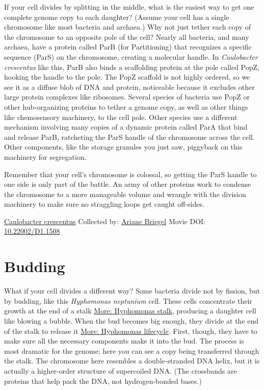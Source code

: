 \documentclass[]{tufte-book}
\begin{document}
If your cell divides by splitting in the middle, what is the easiest way to get one complete genome copy to each daughter? (Assume your cell has a single chromosome like most bacteria and archaea.) Why not just tether each copy of the chromosome to an opposite pole of the cell? Nearly all bacteria, and many archaea, have a protein called ParB (for Partitioning) that recognizes a specific sequence (ParS) on the chromosome, creating a molecular handle. In \emph{Caulobacter crescentus} like this, ParB also binds a scaffolding protein at the pole called PopZ, hooking the handle to the pole. The PopZ scaffold is not highly ordered, so we see it as a diffuse blob of DNA and protein, noticeable because it excludes other large protein complexes like ribosomes. Several species of bacteria use PopZ or other hub-organizing proteins to tether a genome copy, as well as other things like chemosensory machinery, to the cell pole. Other species use a different mechanism involving many copies of a dynamic protein called ParA that bind and release ParB, ratcheting the ParS handle of the chromosome across the cell. Other components, like the storage granules you just saw, piggyback on this machinery for segregation.

Remember that your cell's chromosome is colossal, so getting the ParS handle to one side is only part of the battle. An army of other proteins work to condense the chromosome to a more manageable volume and wrangle with the division machinery to make sure no straggling loops get caught off-sides.



\hypertarget{htmlwidget-8f7ce5a3e32dfbf862eb}{}

\label{fig:5-2}\protect\hyperlink{tree}{Caulobacter crescentus} Collected by: \protect\hyperlink{ariane_briegel}{Ariane Briegel} Movie DOI: \href{https://doi.org/10.22002/D1.1508}{10.22002/D1.1508}

\hypertarget{budding}{%
\section{Budding}\label{budding}}

What if your cell divides a different way? Some bacteria divide not by fission, but by budding, like this \emph{Hyphomonas neptunium} cell. These cells concentrate their growth at the end of a stalk \protect\hyperlink{Hyphomonas_stalk}{More: Hyphomonas stalk}, producing a daughter cell like blowing a bubble. When the bud becomes big enough, they divide at the end of the stalk to release it \protect\hyperlink{Hyphomonas_lifecycle}{More: Hyphomonas lifecycle}. First, though, they have to make sure all the necessary components make it into the bud. The process is most dramatic for the genome; here you can see a copy being transferred through the stalk. The chromosome here resembles a double-stranded DNA helix, but it is actually a higher-order structure of supercoiled DNA. (The crossbands are proteins that help pack the DNA, not hydrogen-bonded bases.)
\end{document}
